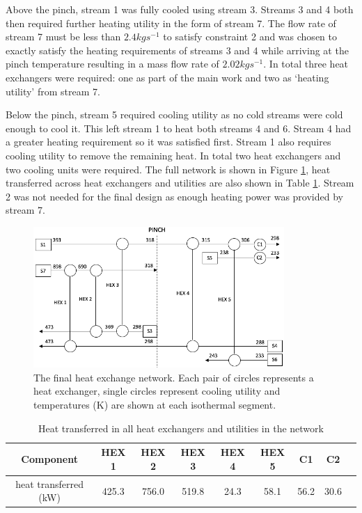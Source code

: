 \documentclass[11pt, oneside]{article}
\begin{document}
Above the pinch, stream 1 was fully cooled using stream 3. Streams 3 and 4 both then required further heating utility in the form of stream 7. The flow rate of stream 7 must be less than $2.4 kg s^{-1}$ to satisfy constraint 2 and was chosen to exactly satisfy the heating requirements of streams 3 and 4 while arriving at the pinch temperature resulting in a mass flow rate of $2.02 kg s^{-1}$. In total three heat exchangers were required: one as part of the main work and two as `heating utility' from stream 7. 

Below the pinch, stream 5 required cooling utility as no cold streams were cold enough to cool it. This left stream 1 to heat both streams 4 and 6. Stream 4 had a greater heating requirement so it was satisfied first. Stream 1 also requires cooling utility to remove the remaining heat. In total two heat exchangers and two cooling units were required. The full network is shown in Figure \ref{fig:heatexnetwork}, heat transferred across heat exchangers and utilities are also shown in Table \ref{tab:powerhex}. Stream 2 was not needed for the final design as enough heating power was provided by stream 7. 

\begin{figure} [h]
\centering
\includegraphics[width=0.85\textwidth]{./pictures/heatexnetworkBIG.png}
  \caption{The final heat exchange network. Each pair of circles represents a heat exchanger, single circles represent cooling utility and temperatures (K) are shown at each isothermal segment.} \label{fig:heatexnetwork}
  \end{figure}

\begin {table} [h]
\begin{center}
\caption{Heat transferred in all heat exchangers and utilities in the network} \label{tab:powerhex} 
\begin{tabular}{ |c|c|c|c|c|c|c|c|c| }
 \hline
  Component & HEX 1 & HEX 2 & HEX 3 & HEX 4 &HEX 5 & C1 & C2\\ 
 \hline
 heat transferred (kW) & 425.3 & 756.0 & 519.8 & 24.3 & 58.1 & 56.2 & 30.6\\ 
 \hline
\end{tabular}
\end{center}  
\end {table}
\end{document}
